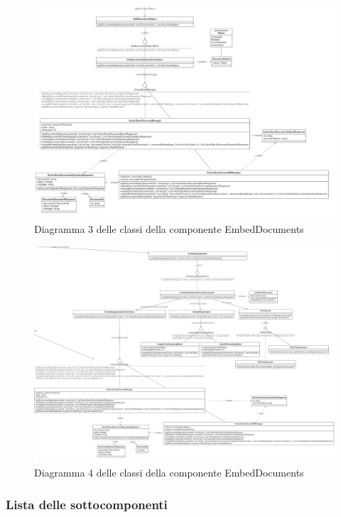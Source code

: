 \documentclass[10pt, a4paper]{article}
\begin{document}
\begin{figure}[H]
    \centering        
    \includegraphics[width=16.5cm]{img/EmbedDocs3.png}
    \caption{Diagramma 3 delle classi della componente EmbedDocuments}
\end{figure}

\begin{figure}[H]
    \centering        
    \includegraphics[width=16.5cm]{img/EmbedDocs4.png}
    \caption{Diagramma 4 delle classi della componente EmbedDocuments}
\end{figure}



\subsubsection{Lista delle sottocomponenti}
\end{document}
